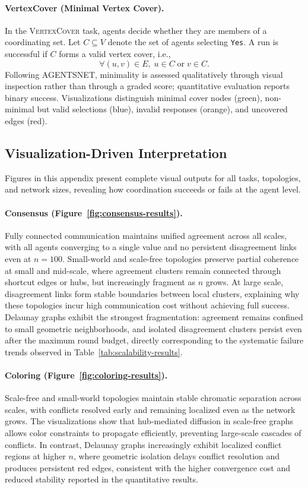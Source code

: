 \paragraph{VertexCover (Minimal Vertex Cover).}
In the \textsc{VertexCover} task, agents decide whether they are members of a coordinating set. Let \(C \subseteq V\) denote the set of agents selecting \texttt{Yes}. A run is successful if \(C\) forms a valid vertex cover, i.e.,
\[
\forall (u,v) \in E,\; u \in C \;\text{or}\; v \in C.
\]
Following AGENTSNET, minimality is assessed qualitatively through visual inspection rather than through a graded score; quantitative evaluation reports binary success. Visualizations distinguish minimal cover nodes (green), non-minimal but valid selections (blue), invalid responses (orange), and uncovered edges (red).



\subsection{Visualization-Driven Interpretation}
\label{appendix:visualization}

Figures in this appendix present complete visual outputs for all tasks, topologies, and network sizes, revealing how coordination succeeds or fails at the agent level.

\paragraph{Consensus (Figure~\ref{fig:consensus-results}).}
Fully connected communication maintains unified agreement across all scales, with all agents converging to a single value and no persistent disagreement links even at \(n=100\). Small-world and scale-free topologies preserve partial coherence at small and mid-scale, where agreement clusters remain connected through shortcut edges or hubs, but increasingly fragment as \(n\) grows. At large scale, disagreement links form stable boundaries between local clusters, explaining why these topologies incur high communication cost without achieving full success. Delaunay graphs exhibit the strongest fragmentation: agreement remains confined to small geometric neighborhoods, and isolated disagreement clusters persist even after the maximum round budget, directly corresponding to the systematic failure trends observed in Table~\ref{tab:scalability-results}.

\paragraph{Coloring (Figure~\ref{fig:coloring-results}).}
Scale-free and small-world topologies maintain stable chromatic separation across scales, with conflicts resolved early and remaining localized even as the network grows. The visualizations show that hub-mediated diffusion in scale-free graphs allows color constraints to propagate efficiently, preventing large-scale cascades of conflicts. In contrast, Delaunay graphs increasingly exhibit localized conflict regions at higher \(n\), where geometric isolation delays conflict resolution and produces persistent red edges, consistent with the higher convergence cost and reduced stability reported in the quantitative results.

